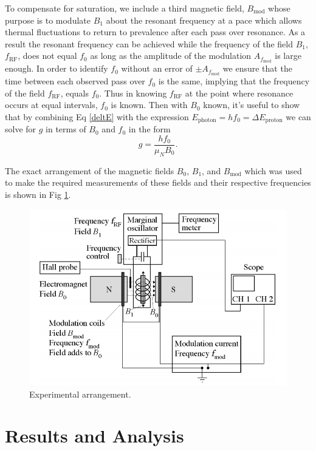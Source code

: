 \documentclass[prb,preprint]{revtex4-1}
\begin{document}
To compensate for saturation, we include a third magnetic field, $B_\text{mod}$ whose purpose is to modulate $B_1$ about the resonant frequency at a pace which allows thermal fluctuations to return to prevalence after each pass over resonance. As a result the resonant frequency can be achieved while the frequency of the field $B_1$, $f_\text{RF}$, does not equal $f_0$ as long as the amplitude of the modulation $A_{f_\text{mod}}$ is large enough. In order to identify $f_0$ without an error of $\pm A_{f_\text{mod}}$ we ensure that the time between each observed pass over $f_0$ is the same, implying that the frequency of the field $f_\text{RF}$, equals $f_0$. Thus in knowing $f_\text{RF}$ at the point where resonance occurs at equal intervals, $f_0$ is known. Then with $B_0$ known, it's useful to show that by combining Eq \eqref{deltE} with the expression $E_{\text{photon}}=hf_0=\Delta E_{\text{proton}}$ we can solve for $g$ in terms of $B_0$ and $f_0$ in the form
\begin{equation}\label{g}
g=\frac{hf_0}{\mu_NB_0}.
\end{equation}

The exact arrangement of the magnetic fields $B_0$, $B_1$, and $B_\text{mod}$ which was used to make the required measurements of these fields and their respective frequencies is shown in Fig \ref{expfig}.
\begin{figure}[h!]
\centering
\includegraphics[width=.8\textwidth]{expfig.png}
\caption{Experimental arrangement.}
\label{expfig}
\end{figure}

\newpage

\section{Results and Analysis}
\end{document}
